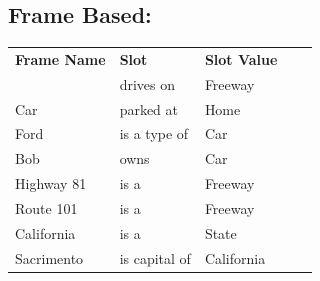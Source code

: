 \documentclass[titlepage]{article}
\begin{document}
\subsection*{Frame Based:}
{
            
\begin{table}[h]
\centering
\begin{tabular}{lllll}

{\color[HTML]{000000} \textbf{Frame Name}}    & {\color[HTML]{000000} \textbf{Slot}}  & {\color[HTML]{000000} \textbf{Slot Value}} &  &  \\ \cline{1-3}
\cellcolor[HTML]{C0C0C0}                      & \cellcolor[HTML]{C0C0C0}drives on     & \cellcolor[HTML]{C0C0C0}Freeway            &  &  \\
\multirow{-2}{*}{\cellcolor[HTML]{C0C0C0}Car} & \cellcolor[HTML]{C0C0C0}parked at     & \cellcolor[HTML]{C0C0C0}Home               &  &  \\
Ford                                          & is a type of                          & Car                                        &  &  \\
\cellcolor[HTML]{C0C0C0}Bob                   & \cellcolor[HTML]{C0C0C0}owns          & \cellcolor[HTML]{C0C0C0}Car                &  &  \\
Highway 81                                    & is a                                  & Freeway                                    &  &  \\
\cellcolor[HTML]{C0C0C0}Route 101             & \cellcolor[HTML]{C0C0C0}is a          & \cellcolor[HTML]{C0C0C0}Freeway            &  &  \\
California                                    & is a                                  & State                                      &  &  \\
\cellcolor[HTML]{C0C0C0}Sacrimento            & \cellcolor[HTML]{C0C0C0}is capital of & \cellcolor[HTML]{C0C0C0}California         &  & 
\end{tabular}
\end{table}
        
}
\end{document}
